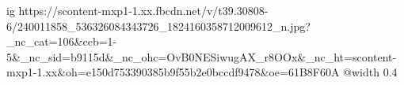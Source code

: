  
 
 
 
 

\ifcmt
  ig https://scontent-mxp1-1.xx.fbcdn.net/v/t39.30808-6/240011858_536326084343726_1824160358712009612_n.jpg?_nc_cat=106&ccb=1-5&_nc_sid=b9115d&_nc_ohc=OvB0NESiwugAX_r8OOx&_nc_ht=scontent-mxp1-1.xx&oh=e150d753390385b9f55b2e0bccdf9478&oe=61B8F60A
  @width 0.4
\fi
